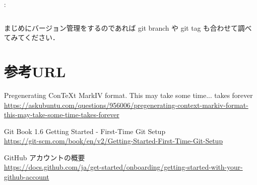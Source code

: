 \documentclass[aspectratio=169,dvipdfmx,cjk]{beamer}
\begin{document}
\begin{frame}{\insertsection \thesubsection: \insertsubsection}
\begin{columns}
\begin{column}{0.23\textwidth}
    \end{column}
  \end{columns}
  \vspace*{3mm}
  \small
  まじめにバージョン管理をするのであれば git branch や git tag も合わせて調べてみてください\cite{VSCodeGit}．
\end{frame}

\section*{参考URL}
\begin{frame}{\insertsection}
  \scriptsize
  \begin{thebibliography}{99}
  \beamertemplatetextbibitems


   Pregenerating ConTeXt MarkIV format. This may take some time... takes forever\\
  \href{https://askubuntu.com/questions/956006/pregenerating-context-markiv-format-this-may-take-some-time-takes-forever
  }{https://askubuntu.com/questions/956006/pregenerating-context-markiv-format-this-may-take-some-time-takes-forever}

   Git Book 1.6 Getting Started - First-Time Git Setup\\
  \href{https://git-scm.com/book/en/v2/Getting-Started-First-Time-Git-Setup
  }{https://git-scm.com/book/en/v2/Getting-Started-First-Time-Git-Setup}

  
   GitHub アカウントの概要\\
  \href{https://docs.github.com/ja/get-started/onboarding/getting-started-with-your-github-account
  }{https://docs.github.com/ja/get-started/onboarding/getting-started-with-your-github-account}
  

\end{thebibliography}
\end{frame}
\end{document}
